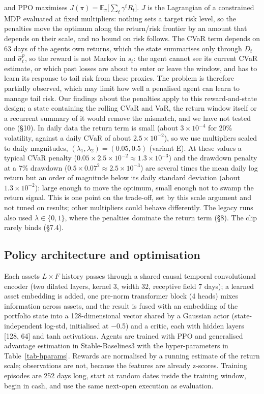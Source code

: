 \documentclass[11pt]{article}
\begin{document}
and PPO maximises \(J(\pi) = \mathbb E_\pi\big[\sum_t \gamma^t R_t\big]\). \(J\) is the Lagrangian of a constrained MDP evaluated at fixed multipliers: nothing sets a target risk level, so the penalties move the optimum along the return/risk frontier by an amount that depends on their scale, and no bound on risk follows. The CVaR term depends on 63 days of the agent\textquotesingle s own returns, which the state summarises only through \(D_t\) and \(\hat\sigma^p_t\), so the reward is not Markov in \(s_t\): the agent cannot see its current CVaR estimate, or which past losses are about to enter or leave the window, and has to learn its response to tail risk from these proxies. The problem is therefore partially observed, which may limit how well a penalised agent can learn to manage tail risk. Our findings about the penalties apply to this reward-and-state design; a state containing the rolling CVaR and VaR, the return window itself or a recurrent summary of it would remove the mismatch, and we have not tested one (\S{}10). In daily data the return term is small (about \(3\times10^{-4}\) for 20\% volatility, against a daily CVaR of about \(2.5\times10^{-2}\)), so we use multipliers scaled to daily magnitudes, \((\lambda_1,\lambda_2) = (0.05, 0.5)\) (variant E). At these values a typical CVaR penalty (\(0.05\times2.5\times10^{-2}\approx1.3\times10^{-3}\)) and the drawdown penalty at a 7\% drawdown (\(0.5\times0.07^2\approx2.5\times10^{-3}\)) are several times the mean daily log return but an order of magnitude below its daily standard deviation (about \(1.3\times10^{-2}\)): large enough to move the optimum, small enough not to swamp the return signal. This is one point on the trade-off, set by this scale argument and not tuned on results; other multipliers could behave differently. The legacy runs also used \(\lambda\in\{0,1\}\), where the penalties dominate the return term (\S{}8). The clip rarely binds (\S{}7.4).

\subsection{Policy architecture and optimisation}\label{policy-architecture-and-optimisation}

Each asset\textquotesingle s \(L\times F\) history passes through a shared causal temporal convolutional encoder \cite{r38} (two dilated layers, kernel 3, width 32, receptive field 7 days); a learned asset embedding is added, one pre-norm transformer block \cite{r39} (4 heads) mixes information across assets, and the result is fused with an embedding of the portfolio state into a 128-dimensional vector shared by a Gaussian actor (state-independent log-std, initialised at $-$0.5) and a critic, each with hidden layers {[}128, 64{]} and tanh activations. Agents are trained with PPO \cite{r18} and generalised advantage estimation \cite{r19} in Stable-Baselines3 \cite{r44} with the hyper-parameters in Table~\ref{tab-hparams}. Rewards are normalised by a running estimate of the return scale; observations are not, because the features are already z-scores. Training episodes are 252 days long, start at random dates inside the training window, begin in cash, and use the same next-open execution as evaluation.
\end{document}
